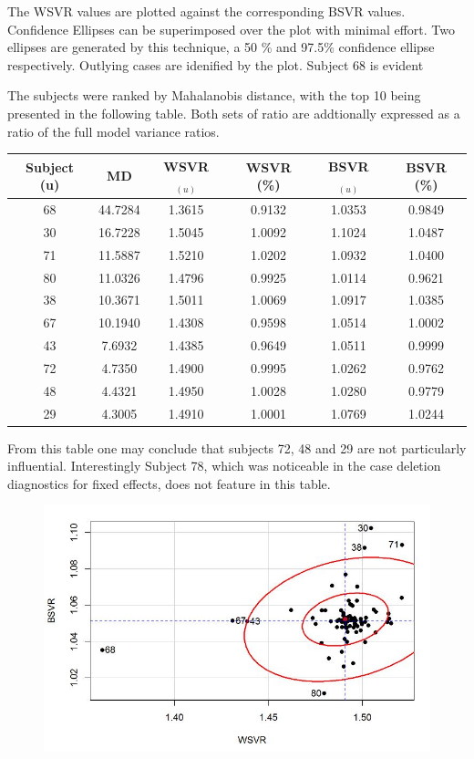 \documentclass[Main.tex]{subfiles}
\begin{document}
The WSVR values are plotted against the corresponding BSVR values. Confidence Ellipses can be superimposed over the plot with minimal effort. Two ellipses are generated by this technique, a 50 \% and 97.5\% confidence ellipse respectively. Outlying cases are idenified by the plot. Subject 68 is evident

The subjects were ranked by Mahalanobis distance, with the top 10 being presented in the following table. Both sets of ratio are addtionally expressed as a ratio of the full model variance ratios. 
\begin{center}
\begin{tabular}{|c|c|c|c|c|c|}
	\hline
	Subject (u) &  MD & WSVR$_{(u)}$ & WSVR (\%) & BSVR$_{(u)}$   & BSVR (\%)     \\ \hline \hline
     68 & 44.7284   & 1.3615  & 0.9132   & 1.0353  & 0.9849 \\ \hline
    30 & 16.7228   & 1.5045  & 1.0092   & 1.1024  & 1.0487 \\ \hline
    71 & 11.5887   & 1.5210  & 1.0202   & 1.0932  & 1.0400 \\ \hline
    80 & 11.0326   & 1.4796  & 0.9925   & 1.0114  & 0.9621 \\ \hline 
    38 & 10.3671   & 1.5011  & 1.0069   & 1.0917  & 1.0385 \\ \hline 
    67 & 10.1940   & 1.4308  & 0.9598   & 1.0514  & 1.0002 \\ \hline
    43  & 7.6932   & 1.4385  & 0.9649   & 1.0511  & 0.9999 \\ \hline
    72  & 4.7350   & 1.4900  & 0.9995   & 1.0262  & 0.9762 \\ \hline
    48  & 4.4321   & 1.4950  & 1.0028   & 1.0280  & 0.9779 \\ \hline
    29  & 4.3005   & 1.4910  & 1.0001   & 1.0769  & 1.0244 \\ \hline
\end{tabular} 
\end{center}
From this table one may conclude that subjects 72, 48 and 29 are not particularly influential. Interestingly Subject 78, which was noticeable in the case deletion diagnostics for fixed effects, does not feature in this table.

\begin{figure}[h!]
\centering
\includegraphics[width=0.9\linewidth]{08-plot1}
\caption{}
\label{fig:08-plot1}
\end{figure}
\end{document}
